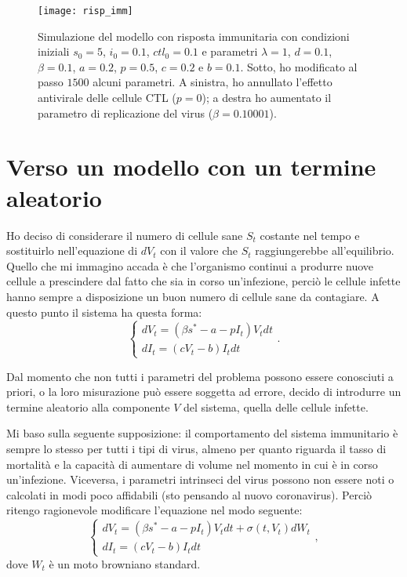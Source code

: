 \documentclass[12pt,a4paper,oneside]{amsart}
\theoremstyle{definition}
\begin{document}
\begin{figure}
\caption{Simulazione del modello con risposta immunitaria con condizioni iniziali $s_0=5$, $i_0=0.1$, $ctl_0=0.1$ e parametri $\lambda=1$, $d=0.1$, $\beta=0.1$, $a=0.2$, $p=0.5$, $c=0.2$ e $b=0.1$. Sotto, ho modificato al passo $1500$ alcuni parametri. A sinistra, ho annullato l'effetto antivirale delle cellule CTL ($p=0$); a destra ho aumentato il parametro di replicazione del virus ($\beta=0.10001$).}
\texttt{[image: risp\_imm]}
\end{figure}

\section{Verso un modello con un termine aleatorio}
Ho deciso di considerare il numero di cellule sane $S_t$ costante nel tempo e sostituirlo nell'equazione di $dV_t$ con il valore che $S_t$ raggiungerebbe all'equilibrio. Quello che mi immagino accada è che l'organismo continui a produrre nuove cellule a prescindere dal fatto che sia in corso un'infezione, perciò le cellule infette hanno sempre a disposizione un buon numero di cellule sane da contagiare. A questo punto il sistema ha questa forma:
$$\begin{cases}
dV_t=\left(\beta s^* -a -pI_t\right)V_tdt\\
dI_t=\left(cV_t-b\right)I_tdt
\end{cases}.$$

Dal momento che non tutti i parametri del problema possono essere conosciuti a priori, o la loro misurazione può essere soggetta ad errore, decido di introdurre un termine aleatorio alla componente $V$ del sistema, quella delle cellule infette. 

Mi baso sulla seguente supposizione: il comportamento del sistema immunitario è sempre lo stesso per tutti i tipi di virus, almeno per quanto riguarda il tasso di mortalità e la capacità di aumentare di volume nel momento in cui è in corso un'infezione. Viceversa, i parametri intrinseci del virus possono non essere noti o calcolati in modi poco affidabili (sto pensando al nuovo coronavirus). Perciò ritengo ragionevole modificare l'equazione nel modo seguente:
$$\begin{cases}
dV_t=\left(\beta s^* -a -pI_t\right)V_tdt + \sigma(t,V_t)dW_t\\
dI_t=\left(cV_t-b\right)I_tdt
\end{cases},$$
dove $W_t$ è un moto browniano standard.
\end{document}
